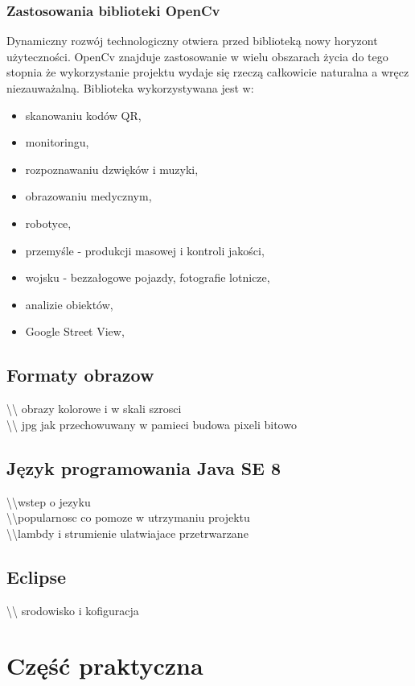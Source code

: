 \documentclass[a4paper,12pt]{article}
\begin{document}
		\subsubsection{Zastosowania biblioteki OpenCv}
			Dynamiczny rozwój technologiczny otwiera przed biblioteką nowy horyzont użyteczności.
			OpenCv znajduje zastosowanie w wielu obszarach życia do tego stopnia że wykorzystanie projektu wydaje się rzeczą całkowicie naturalna a wręcz niezauważalną. Biblioteka wykorzystywana jest w:
			\begin{itemize}
				\item skanowaniu kodów QR,
				\item monitoringu,
				\item rozpoznawaniu dzwięków i muzyki,
				\item obrazowaniu medycznym,
				\item robotyce,	
				\item przemyśle - produkcji masowej i kontroli jakości,
				\item wojsku - bezzałogowe pojazdy, fotografie lotnicze,
				\item analizie obiektów,
				\item Google Street View,
			\end{itemize}

	
	\subsection{Formaty obrazow}
		\textbackslash\textbackslash
		obrazy kolorowe i w skali szrosci\\
		\textbackslash\textbackslash
		jpg jak przechowuwany w pamieci budowa pixeli bitowo

	\subsection{Język programowania Java SE 8}
		\textbackslash\textbackslash wstep o jezyku \\
		\textbackslash\textbackslash popularnosc co pomoze w utrzymaniu projektu \\
		\textbackslash\textbackslash lambdy i strumienie ulatwiajace przetrwarzane


	\subsection{Eclipse}
		\textbackslash\textbackslash
		srodowisko i kofiguracja


\section{Część praktyczna}
\end{document}
